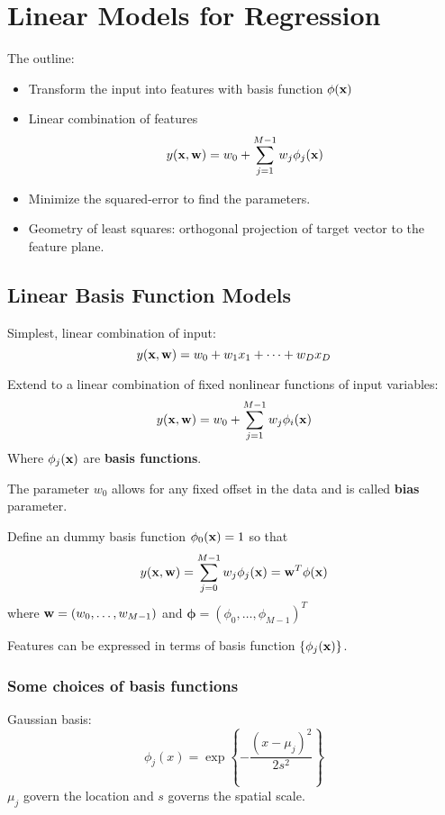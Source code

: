 \chapter{Linear Models for Regression}
The outline:
\begin{itemize}
    \item Transform the input into features with basis function
        $\phi(\mathbf{x})$
    \item Linear combination of features
        \[
            y(\mathbf{x}, \mathbf{w}) = w_0 + \sum_{j=1}^{M-1}w_j\phi_j(\mathbf{x})
        \]
    \item Minimize the squared-error to find the parameters.
    \item Geometry of least squares: orthogonal projection of target
        vector to the feature plane.
\end{itemize}
\section{Linear Basis Function Models}
Simplest, linear combination of input:
\begin{equation}
    y(\mathbf{x}, \mathbf{w}) = w_0 + w_1 x_1 + \cdots + w_D x_D
\end{equation}

Extend to a linear combination of fixed nonlinear functions of input
variables:
\begin{equation}
    y(\mathbf{x}, \mathbf{w}) = w_0 + \sum_{j=1}^{M-1} w_j \phi_i(\mathbf{x})
\end{equation}
Where $\phi_j(\mathbf{x})$ are \textbf{basis functions}.

The parameter $w_0$ allows for any fixed offset in the data and is called
\textbf{bias} parameter.

Define an dummy basis function $\phi_0(\mathbf{x}) = 1$ so that 
\begin{equation}
    y(\mathbf{x}, \mathbf{w}) = \sum_{j=0}^{M-1}w_j \phi_j(\mathbf{x}) = \mathbf{w}^T \phi(\mathbf{x})
\end{equation}
where $\mathbf{w} = (w_0, \dots, w_{M-1})$ and $\boldsymbol\phi = {(\phi_0, \dots,
\phi_{M-1})}^T$

Features can be expressed in terms of basis function $\{\phi_j(\mathbf{x})\}$.

\subsection{Some choices of basis functions}
Gaussian basis:
\begin{equation}
    \phi_j(x) = \exp\left\{ -\frac{{(x-\mu_j)}^2}{2s^2} \right\}
\end{equation}
$\mu_j$ govern the location and $s$ governs the spatial scale.

